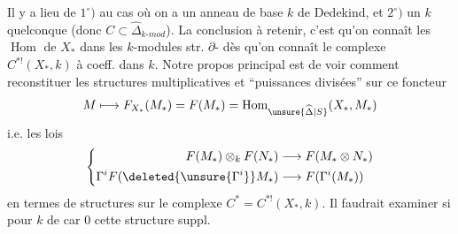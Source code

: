 Il y a lieu de 
$1^\circ)$ au cas où on a un anneau
de base $k$ de Dedekind,
et $2^\circ)$ un $k$ quelconque 
(donc $C\subset\widehat\Delta_{k\text{-}mod}$). La 
conclusion à retenir, c'est
qu'on connaît les $\operatorname{Hom}$ de
$X_*$ dans les $k$-modules str.
$\partial$-  dès qu'on connaît
le complexe  $C^{*!}(X_*,k)$ à coeff. dans
$k$. Notre propos principal
est de voir comment reconstituer
les structures multiplicatives
et ``puissances divisées'' sur ce
foncteur
\[
M\longmapsto F_{X_*}(M_*)=F(M_*)=\operatorname{Hom}_{\unsure{\widehat\Delta|S}}(X_*,M_*)
\]
i.e. les lois
\[
\left\{\begin{aligned}
F(M_*)\otimes_k F(N_*)&\longrightarrow F(M_*\otimes N_*)\\
\Gamma^iF(\deleted{\unsure{\Gamma^i}}M_*)&\longrightarrow F(\Gamma^i(M_*))
\end{aligned}\right.
\]
en termes de  structures
sur le complexe  $C^*=C^{*!}(X_*,k)$.
Il faudrait examiner si pour
$k$ de car $0$  cette structure suppl.
